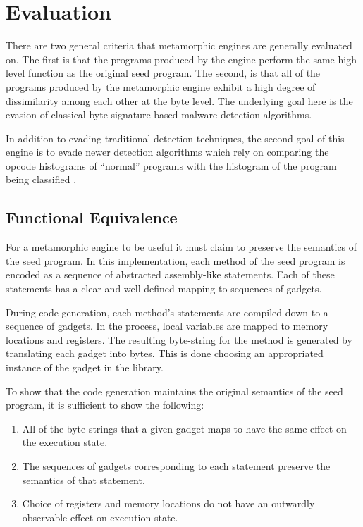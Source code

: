 \chapter{Evaluation}

    There are two general criteria that metamorphic engines are generally
    evaluated on. The first is that the programs produced by the engine
    perform the same high level function as the original seed program. The
    second, is that all of the programs produced by the metamorphic engine
    exhibit a high degree of dissimilarity among each other at the byte
    level. The underlying goal here is the evasion of classical
    byte-signature based malware detection algorithms.

    In addition to evading traditional detection techniques, the second goal
    of this engine is to evade newer detection algorithms which rely on
    comparing the opcode histograms of ``normal'' programs with the
    histogram of the program being classified \cite{histogram}.

\section{Functional Equivalence}

    For a metamorphic engine to be useful it must claim to preserve the
    semantics of the seed program. In this implementation, each method of
    the seed program is encoded as a sequence of abstracted assembly-like
    statements. Each of these statements has a clear and well defined
    mapping to sequences of gadgets.
    
    During code generation, each method's statements are compiled down to a
    sequence of gadgets. In the process, local variables are mapped to
    memory locations and registers. The resulting byte-string for the method
    is generated by translating each gadget into bytes. This is done
    choosing an appropriated instance of the gadget in the library.

    To show that the code generation maintains the original semantics of the
    seed program, it is sufficient to show the following:

    \begin{enumerate}

        \item All of the byte-strings that a given gadget maps to have the
            same effect on the execution state.

        \item The sequences of gadgets corresponding to each statement
            preserve the semantics of that statement.

        \item Choice of registers and memory locations do not have an
            outwardly observable effect on execution state.

    \end{enumerate}

